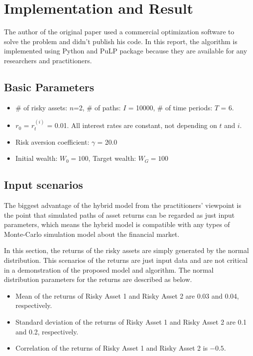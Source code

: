 \documentclass[11t]{article}
\begin{document}
\section{Implementation and Result}
The author of the original paper used a commercial optimization software to solve the problem and didn't publish his code. In this report, the algorithm is implemented using Python and PuLP package because they are available for any researchers and practitioners.
\subsection{Basic Parameters}

\begin{itemize}
  \item \# of risky assets: $n$=2,  \hspace{1em} \# of paths: $I$ = 10000,  \hspace{1em} \# of time periods: $T$ = 6.
  \item $r_0$ = $r_{t}^{(i)}$ = 0.01. All interest rates are constant, not depending on $t$ and $i$. 
  \item Risk aversion coefficient: $\gamma$ = 20.0
  \item Initial wealth: $W_0 = 100$, \hspace{1em} Target wealth: $W_G = 100$
\end{itemize}

\subsection{Input scenarios}
The biggest advantage of the hybrid model from the practitioners' viewpoint is the point that simulated paths of asset returns can be regarded as just input parameters, 
which means the hybrid model is compatible with any types of Monte-Carlo simulation model about the financial market. 

In this section, the returns of the risky assets are simply generated by the normal distribution. This scenarios of the returns are just input data and are not critical in a demonstration of the proposed model and algorithm. The normal distribution parameters for the returns are described as below.
\begin{itemize}
  \item Mean of the returns of Risky Asset 1 and Risky Asset 2 are 0.03 and 0.04, respectively.
  \item Standard deviation of the returns of Risky Asset 1 and Risky Asset 2 are 0.1 and 0.2, respectively.
  \item Correlation of the returns of Risky Asset 1 and Risky Asset 2 is $-0.5$.
\end{itemize}
\end{document}
